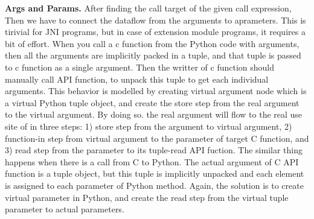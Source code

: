 \textbf{Args and Params.} After finding the call target of the given call
expression, Then we have to connect the dataflow from the arguments to
aprameters.  This is tirivial for JNI programs, but in case of extension module
programs, it requires a bit of effort. When you call a c function from the
Python code with arguments, then all the arguments are implicitly packed in a
tuple, and that tuple is passed to c function as a single argument. Then the
writter of c function should manually call API function,
 to unpack this tuple to get each individual
arguments. This behavior is modelled by creating virtual argument node which is
a virtual Python tuple object, and create the store step from the real argument
to the virtual argument.  By doing so. the real argument will flow to the real
use site of in three steps: 1) store step from the argument to virtual
argument, 2) function-in step from virtual argument to the parameter of target
C function, and 3) read step from the parameter to its tuple-read API fuction.
The similar thing happens when there is a call from C to Python. The actual
argument of C API function is a tuple object, but this tuple is implicitly
unpacked and each element is assigned to each parameter of Python method.
Again, the solution is to create virtual parameter in Python, and create the
read step from the virtual tuple parameter to actual parameters.
